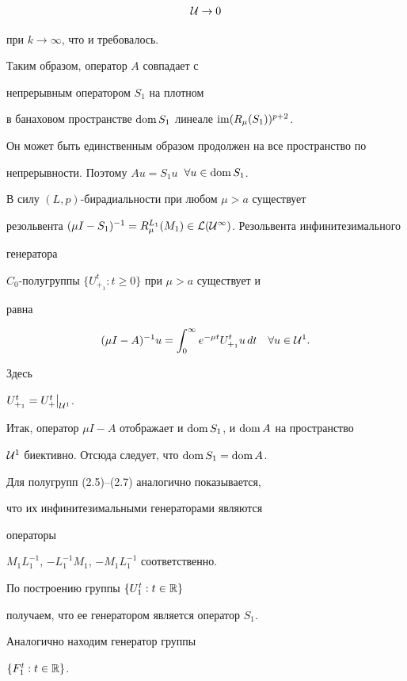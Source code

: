 \begin{pf}
\begin{multline*}
{{\cal U}}\to 0


\end{multline*}


при $k\to\infty $, что и требовалось.





Таким образом, оператор $A$ совпадает с


непрерывным оператором $S_1$ на плотном


в банаховом пространстве $\operatorname{dom} S_1$ линеале $\operatorname{im} (R_{\mu}(S_1))^{p+2}$.


Он может быть единственным образом продолжен на все пространство по


непрерывности. Поэтому $Au=S_1u$\, $\forall u\in \operatorname{dom} S_1$.


В силу $(L,p)$-бирадиальности при любом $\mu >a$ существует


резольвента $(\mu I-S_1)^{-1}=


R_{\mu }^{L_1}(M_1)\in \cal L(\cal U^1)$. Резольвента инфинитезимального


генератора


$C_0$-полугруппы $\{U_{+_1}^t:t\ge 0\}$ при $\mu >a$ существует и


равна


$$


(\mu I-A)^{-1}u=\int_0^{\infty }e^{-\mu t}U_{+_1}^tu\,dt\quad\forall u\in


{\cal U}^1.


$$


Здесь


$U^t_{+_1}=U^t_+\big|_{{\cal U}^1}$.


Итак, оператор $\mu I-A$ отображает и $\operatorname{dom} S_1$, и $\operatorname{dom} A$ на пространство


${\cal U}^1$ биективно. Отсюда следует, что $\operatorname{dom} S_1=\operatorname{dom} A$.





Для полугрупп (2.5)--(2.7) аналогично показывается,


что их инфинитезимальными генераторами являются


операторы


$M_1L_1^{-1}$, $-L_1^{-1}M_1$, $-M_1L_1^{-1}$ соответственно.





По построению группы $\{ U^t_1:t\in{\Bbb R}\}$


получаем, что ее генератором  является оператор $S_1$.





Аналогично находим генератор группы


$\{ F^t_1:t\in{\Bbb R}\}$.


\end{pf}





